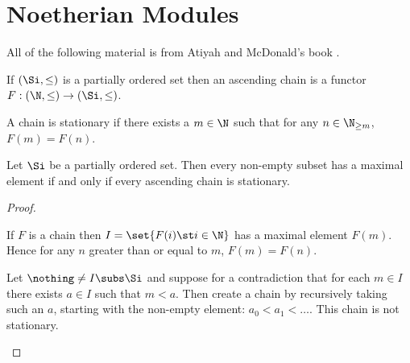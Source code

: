\section{Noetherian Modules}
All of the following material is from Atiyah and McDonald's book \cite{atiyah}.
\begin{dfn}
    If $(\Si,\leq)$ is a partially ordered set then an ascending chain 
    is a functor $F : (\N,\leq) \to (\Si,\leq)$.

    A chain is stationary if there exists a $m \in \N$ such that
    for any $n \in \N_{\ge m}$, $F(m) = F(n)$.
\end{dfn}

\begin{prop}
    Let $\Si$ be a partially ordered set. 
    Then every non-empty subset has a maximal element
    if and only if every ascending chain is stationary.
\end{prop}
\begin{proof}
    \begin{forward}
        If $F$ is a chain then $I = \set{F(i) \st i \in \N}$
        has a maximal element $F(m)$. 
        Hence for any $n$ greater than or equal to $m$, 
        $F(m) = F(n)$.
    \end{forward}
    \begin{backward}
        Let $\nothing \ne I \subs \Si$ and
        suppose for a contradiction that for each $m \in I$
        there exists $a \in I$ such that $m < a$.
        Then create a chain by recursively taking such an $a$,
        starting with the non-empty element:
        $a_0 < a_1 < \dots$.
        This chain is not stationary.
    \end{backward}
\end{proof}

